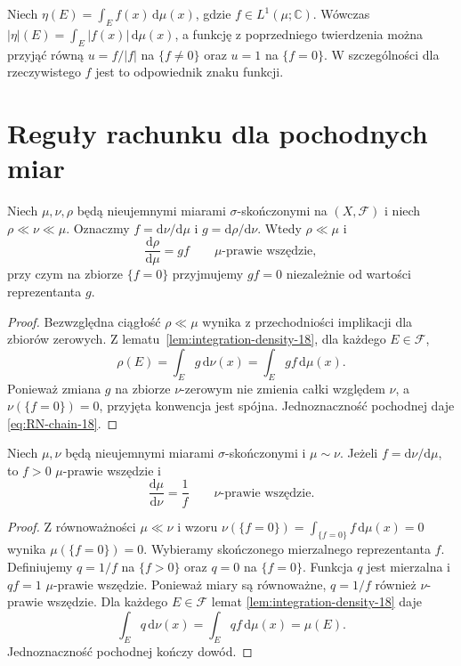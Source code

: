 \begin{przyklad}
Niech $\eta(E)=\int_E f(x)\,\mathrm d\mu(x)$,
gdzie $f\in L^1(\mu;\mathbb C)$. Wówczas
$|\eta|(E)=\int_E|f(x)|\,\mathrm d\mu(x)$,
a funkcję z poprzedniego twierdzenia można przyjąć
równą $u=f/|f|$ na $\{f\neq0\}$ oraz $u=1$
na $\{f=0\}$. W szczególności dla rzeczywistego $f$
jest to odpowiednik znaku funkcji.
\end{przyklad}

\section{Reguły rachunku dla pochodnych miar}
\begin{twierdzenie}
\label{thm:RN-chain-18}
Niech $\mu,\nu,\rho$ będą nieujemnymi miarami
$\sigma$-skończonymi na $(X,\mathcal F)$
i niech $\rho\ll\nu\ll\mu$.
Oznaczmy $f=\mathrm d\nu/\mathrm d\mu$
i $g=\mathrm d\rho/\mathrm d\nu$.
Wtedy $\rho\ll\mu$ i
\begin{equation}\label{eq:RN-chain-18}
\frac{\mathrm d\rho}{\mathrm d\mu}
=g f\qquad\mu\text{-prawie wszędzie},
\end{equation}
przy czym na zbiorze $\{f=0\}$ przyjmujemy $gf=0$
niezależnie od wartości reprezentanta $g$.
\end{twierdzenie}
\begin{proof}
Bezwzględna ciągłość $\rho\ll\mu$ wynika
z przechodniości implikacji dla zbiorów zerowych.
Z lematu~\ref{lem:integration-density-18}, dla każdego
$E\in\mathcal F$,
\[
\rho(E)=\int_Eg\,\mathrm d\nu(x)
=\int_Eg f\,\mathrm d\mu(x).
\]
Ponieważ zmiana $g$ na zbiorze $\nu$-zerowym nie zmienia
całki względem $\nu$, a $\nu(\{f=0\})=0$,
przyjęta konwencja jest spójna. Jednoznaczność
pochodnej daje \eqref{eq:RN-chain-18}.
\end{proof}

\begin{twierdzenie}
\label{thm:RN-inverse-18}
Niech $\mu,\nu$ będą nieujemnymi miarami
$\sigma$-skończonymi i $\mu\sim\nu$.
Jeżeli $f=\mathrm d\nu/\mathrm d\mu$, to
$f>0$ $\mu$-prawie wszędzie i
\begin{equation}\label{eq:RN-inverse-18}
\frac{\mathrm d\mu}{\mathrm d\nu}=\frac1f
\qquad\nu\text{-prawie wszędzie}.
\end{equation}
\end{twierdzenie}
\begin{proof}
Z równoważności $\mu\ll\nu$ i wzoru
$\nu(\{f=0\})=\int_{\{f=0\}}f\,\mathrm d\mu(x)=0$
wynika $\mu(\{f=0\})=0$. Wybieramy skończonego mierzalnego reprezentanta $f$.
Definiujemy $q=1/f$ na $\{f>0\}$ oraz $q=0$ na $\{f=0\}$.
Funkcja $q$ jest mierzalna i $qf=1$ $\mu$-prawie wszędzie.
Ponieważ miary są równoważne, $q=1/f$ również
$\nu$-prawie wszędzie. Dla każdego $E\in\mathcal F$ lemat
\ref{lem:integration-density-18} daje
\[
\int_E q\,\mathrm d\nu(x)
=\int_E qf\,\mathrm d\mu(x)=\mu(E).
\]
Jednoznaczność pochodnej kończy dowód.
\end{proof}

